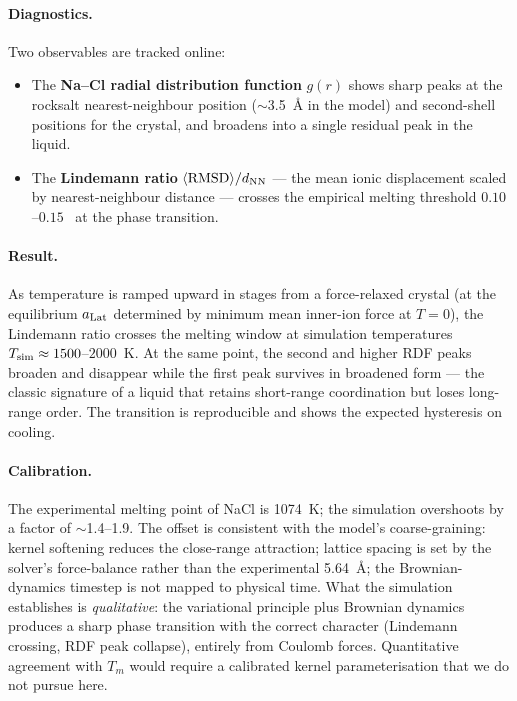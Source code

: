 \paragraph{Diagnostics.}
Two observables are tracked online:
\begin{itemize}
\item The \textbf{Na--Cl radial distribution function} $g(r)$ shows sharp peaks at the rocksalt nearest-neighbour position ($\sim$3.5~\AA{} in the model) and second-shell positions for the crystal, and broadens into a single residual peak in the liquid.
\item The \textbf{Lindemann ratio} $\langle\mathrm{RMSD}\rangle / d_{\rm NN}$ --- the mean ionic displacement scaled by nearest-neighbour distance --- crosses the empirical melting threshold $0.10$--$0.15$~\cite{Lindemann10} at the phase transition.
\end{itemize}

\paragraph{Result.}
As temperature is ramped upward in stages from a force-relaxed crystal (at the equilibrium $a_{\rm Lat}$ determined by minimum mean inner-ion force at $T = 0$), the Lindemann ratio crosses the melting window at simulation temperatures $T_{\rm sim} \approx 1500$--$2000$~K. At the same point, the second and higher RDF peaks broaden and disappear while the first peak survives in broadened form --- the classic signature of a liquid that retains short-range coordination but loses long-range order. The transition is reproducible and shows the expected hysteresis on cooling.

\paragraph{Calibration.}
The experimental melting point of NaCl is 1074~K; the simulation overshoots by a factor of $\sim$1.4--1.9. The offset is consistent with the model's coarse-graining: kernel softening reduces the close-range attraction; lattice spacing is set by the solver's force-balance rather than the experimental 5.64~\AA; the Brownian-dynamics timestep is not mapped to physical time. What the simulation establishes is \emph{qualitative}: the variational principle plus Brownian dynamics produces a sharp phase transition with the correct character (Lindemann crossing, RDF peak collapse), entirely from Coulomb forces. Quantitative agreement with $T_m$ would require a calibrated kernel parameterisation that we do not pursue here.

